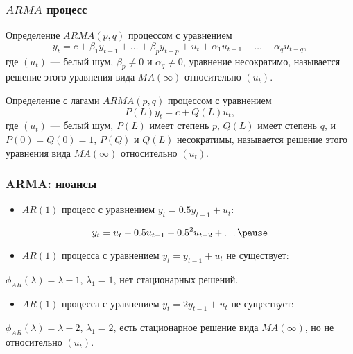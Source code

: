 \begin{frame}
  \frametitle{$ARMA$ процесс}

  \begin{block}{Определение}
    $ARMA(p, q)$ процессом с уравнением 
    \[
      y_t = c + \beta_1 y_{t-1} + \ldots + \beta_p y_{t-p} + u_t + \alpha_1 u_{t-1} + \ldots + \alpha_q u_{t-q}, 
    \]
    где $(u_t)$ — белый шум, $\beta_p \neq 0$ и $\alpha_q \neq 0$, уравнение несократимо, называется 
    решение этого уравнения вида $MA(\infty)$ относительно $(u_t)$.
  \end{block}

  \pause  
  \begin{block}{Определение с лагами}
    $ARMA(p,q)$ процессом с уравнением 
    \[
      P(L)y_t = c + Q(L)u_t, 
    \]
    где $(u_t)$ — белый шум, $P(L)$ имеет степень $p$, $Q(L)$ имеет степень $q$, и $P(0)=Q(0)=1$, 
    $P(Q)$ и $Q(L)$ несократимы, называется решение этого уравнения вида $MA(\infty)$ относительно $(u_t)$.  
  \end{block}
\end{frame}


\begin{frame}
  \frametitle{ARMA: нюансы}

  \pause
  \begin{itemize}
    \item $AR(1)$ процесс с уравнением $y_t = 0.5 y_{t-1} + u_t$:
  \end{itemize}
  \pause
  \[
  y_t = u_t + 0.5 u_{t-1} + 0.5^2 u_{t-2} + \ldots   \pause
  \]
  \begin{itemize}
    \item $AR(1)$ процесса с уравнением $y_t = y_{t-1} + u_t$ не существует:
  \end{itemize}
  \pause
  $\phi_{AR}(\lambda) = \lambda - 1$, $\lambda_1 = 1$, нет стационарных решений. 

  \pause
  \begin{itemize}
    \item $AR(1)$ процесса с уравнением $y_t = 2 y_{t-1} + u_t$ не существует:
  \end{itemize}
  \pause
  $\phi_{AR}(\lambda) = \lambda - 2$, $\lambda_1 = 2$, есть стационарное решение 
  вида $MA(\infty)$, но не относительно $(u_t)$.
  
\end{frame}

